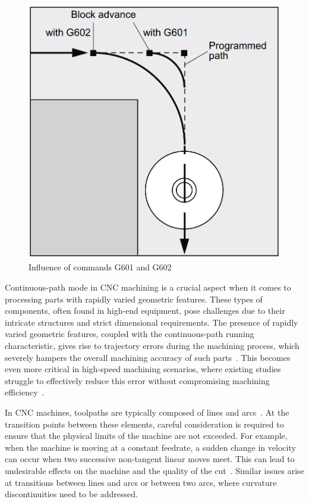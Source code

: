 \begin{figure}[H]
 	\centerline{\includegraphics[scale=.3]{figures/conti3.png}}
 	\caption{Influence of commands G601 and G602~\cite{sinumericmanual}}
 	\label{C4}
\end{figure}
 
 
 
Continuous-path mode in \acrshort{CNC} machining is a crucial aspect when it comes to processing parts with rapidly varied geometric features. These types of components, often found in high-end equipment, pose challenges due to their intricate structures and strict dimensional requirements. The presence of rapidly varied geometric features, coupled with the continuous-path running characteristic, gives rise to trajectory errors during the machining process, which severely hampers the overall machining accuracy of such parts~\cite{Shahzadeh.2018}. This becomes even more critical in high-speed machining scenarios, where existing studies struggle to effectively reduce this error without compromising machining efficiency~\cite{Li.2018}.

In \acrshort{CNC} machines, toolpaths are typically composed of lines and arcs~\cite{Liu.2020}. At the transition points between these elements, careful consideration is required to ensure that the physical limits of the machine are not exceeded. For example, when the machine is moving at a constant feedrate, a sudden change in velocity can occur when two successive non-tangent linear moves meet. This can lead to undesirable effects on the machine and the quality of the cut~\cite{Boujelbene.2004}. Similar issues arise at transitions between lines and arcs or between two arcs, where curvature discontinuities need to be addressed. 

